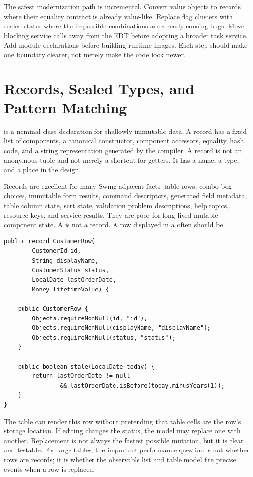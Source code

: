 The safest modernization path is incremental. Convert value objects to records where their equality contract is already value-like. Replace flag clusters with sealed states where the impossible combinations are already causing bugs. Move blocking service calls away from the EDT before adopting a broader task service. Add module declarations before building runtime images. Each step should make one boundary clearer, not merely make the code look newer.

\section{Records, Sealed Types, and Pattern Matching}

 is a nominal class declaration for shallowly immutable data. A record has a fixed list of components, a canonical constructor, component accessors, equality, hash code, and a string representation generated by the compiler. A record is not an anonymous tuple and not merely a shortcut for getters. It has a name, a type, and a place in the design.

Records are excellent for many Swing-adjacent facts: table rows, combo-box choices, immutable form results, command descriptors, generated field metadata, table column state, sort state, validation problem descriptions, help topics, resource keys, and service results. They are poor for long-lived mutable component state. A  is not a record. A row displayed in a  often should be.

\begin{lstlisting}[caption={A row value that is honest about immutability.}]
public record CustomerRow(
        CustomerId id,
        String displayName,
        CustomerStatus status,
        LocalDate lastOrderDate,
        Money lifetimeValue) {

    public CustomerRow {
        Objects.requireNonNull(id, "id");
        Objects.requireNonNull(displayName, "displayName");
        Objects.requireNonNull(status, "status");
    }

    public boolean stale(LocalDate today) {
        return lastOrderDate != null
                && lastOrderDate.isBefore(today.minusYears(1));
    }
}
\end{lstlisting}

The table can render this row without pretending that table cells are the row's storage location. If editing changes the status, the model may replace one  with another. Replacement is not always the fastest possible mutation, but it is clear and testable. For large tables, the important performance question is not whether rows are records; it is whether the observable list and table model fire precise events when a row is replaced.

